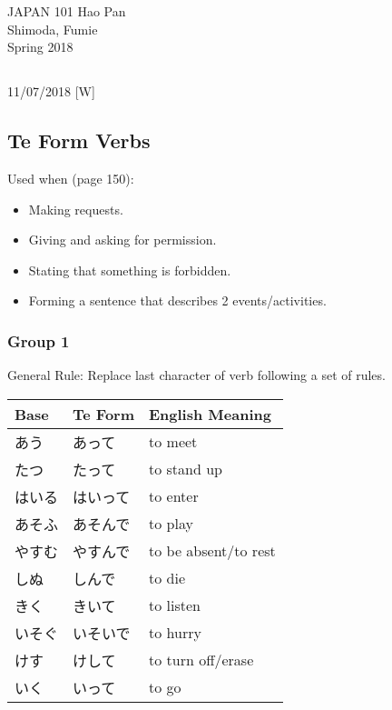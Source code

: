 \documentclass{article}
\begin{document}
 \begin{CJK}{UTF8}{min}

\noindent
{JAPAN 101 \hfill Hao Pan}\\
{Shimoda, Fumie}\\
{Spring 2018}


\begin{center}
\section{}
\noindent
{\hfill 11/07/2018 [W]}
\end{center}

\subsection{Te Form Verbs}

\bigskip

Used when (page 150):
\begin{itemize}
\item Making requests.
\item Giving and asking for permission.
\item Stating that something is forbidden.
\item Forming a sentence that describes 2 events/activities.
\end{itemize}

\subsubsection{Group 1}
General Rule: Replace last character of verb following a set of rules.

\bigskip

\begin{multicols}{2}

\begin{tabular}{ | l | l | l | }
\hline
Base & Te Form & English Meaning\\
\hline
あう & あって & to meet\\
たつ & たって & to stand up\\
はいる & はいって & to enter\\
あそふ & あそんで & to play\\
やすむ & やすんで & to be absent/to rest\\
しぬ & しんで & to die\\
きく & きいて & to listen\\
いそぐ & いそいで & to hurry\\
けす & けして & to turn off/erase\\
いく & いって & to go\\
\hline
\end{tabular}


\end{multicols}
\end{CJK}
\end{document}
